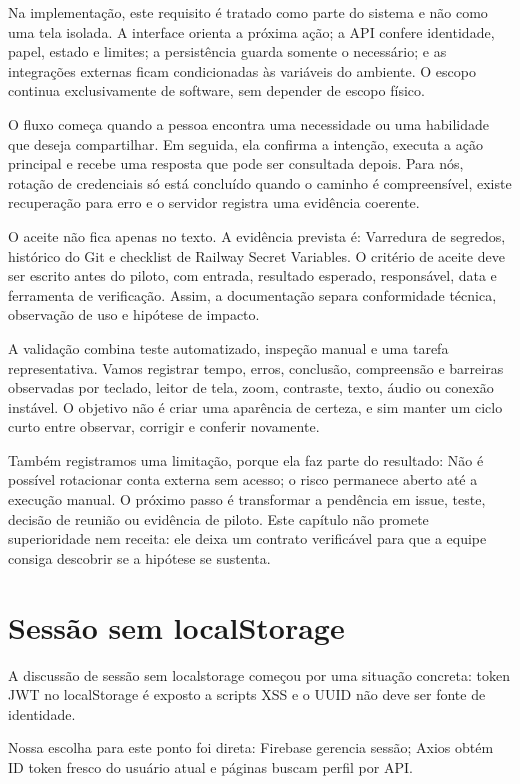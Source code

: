 \documentclass[12pt,oneside,a4paper,article]{abntex2}
\begin{document}
Na implementação, este requisito é tratado como parte do sistema e não como uma tela isolada. A interface orienta a próxima ação; a API confere identidade, papel, estado e limites; a persistência guarda somente o necessário; e as integrações externas ficam condicionadas às variáveis do ambiente. O escopo continua exclusivamente de software, sem depender de escopo físico.

O fluxo começa quando a pessoa encontra uma necessidade ou uma habilidade que deseja compartilhar. Em seguida, ela confirma a intenção, executa a ação principal e recebe uma resposta que pode ser consultada depois. Para nós, rotação de credenciais só está concluído quando o caminho é compreensível, existe recuperação para erro e o servidor registra uma evidência coerente.

O aceite não fica apenas no texto. A evidência prevista é: Varredura de segredos, histórico do Git e checklist de Railway Secret Variables. O critério de aceite deve ser escrito antes do piloto, com entrada, resultado esperado, responsável, data e ferramenta de verificação. Assim, a documentação separa conformidade técnica, observação de uso e hipótese de impacto.

A validação combina teste automatizado, inspeção manual e uma tarefa representativa. Vamos registrar tempo, erros, conclusão, compreensão e barreiras observadas por teclado, leitor de tela, zoom, contraste, texto, áudio ou conexão instável. O objetivo não é criar uma aparência de certeza, e sim manter um ciclo curto entre observar, corrigir e conferir novamente.

Também registramos uma limitação, porque ela faz parte do resultado: Não é possível rotacionar conta externa sem acesso; o risco permanece aberto até a execução manual. O próximo passo é transformar a pendência em issue, teste, decisão de reunião ou evidência de piloto. Este capítulo não promete superioridade nem receita: ele deixa um contrato verificável para que a equipe consiga descobrir se a hipótese se sustenta.

\section{Sessão sem localStorage}
A discussão de sessão sem localstorage começou por uma situação concreta: token JWT no localStorage é exposto a scripts XSS e o UUID não deve ser fonte de identidade.

Nossa escolha para este ponto foi direta: Firebase gerencia sessão; Axios obtém ID token fresco do usuário atual e páginas buscam perfil por API.
\end{document}
